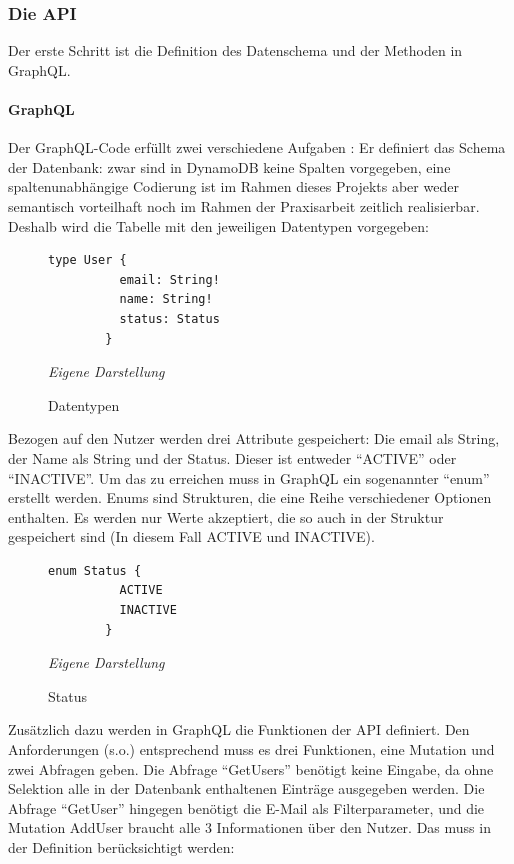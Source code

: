 	\subsubsection{Die API}
	Der erste Schritt ist die Definition des Datenschema und der Methoden in GraphQL.
	\paragraph{GraphQL}
	Der GraphQL-Code erfüllt zwei verschiedene Aufgaben \cite{GraphQL2024}: Er definiert das Schema der Datenbank: zwar sind in DynamoDB keine Spalten vorgegeben, eine spaltenunabhängige Codierung ist im Rahmen dieses Projekts aber weder semantisch vorteilhaft noch im Rahmen der Praxisarbeit zeitlich realisierbar. Deshalb wird die Tabelle mit den jeweiligen Datentypen vorgegeben:
	
		\begin{figure}[H]
		\centering
		\begin{minipage}[t]{.7\textwidth} %
		\caption{Datentypen} %
		\begin{lstlisting}[style=graphql]
		type User {
		  email: String!
		  name: String!
		  status: Status
		}
		\end{lstlisting}
		\textit{Eigene Darstellung} %
		\label{fig:datenTypen}
		\end{minipage}
		\end{figure}
	Bezogen auf den Nutzer werden drei Attribute gespeichert: Die email als String, der Name als String und der Status. Dieser ist entweder ``ACTIVE'' oder ``INACTIVE''. Um das zu erreichen muss in GraphQL ein sogenannter ``enum'' erstellt werden. Enums sind Strukturen, die eine Reihe verschiedener Optionen enthalten. Es werden nur Werte akzeptiert, die so auch in der Struktur gespeichert sind (In diesem Fall ACTIVE und INACTIVE). \cite{https://graphql.com/learn/enums/}
	
		\begin{figure}[H]
		\centering
		\begin{minipage}[t]{.7\textwidth} %
		\caption{Status} %
		\begin{lstlisting}[style=graphql]
		enum Status {
		  ACTIVE
		  INACTIVE
		}
		\end{lstlisting}
		\textit{Eigene Darstellung} %
		\label{fig:status}
		\end{minipage}
		\end{figure}
	
	Zusätzlich dazu werden in GraphQL die Funktionen der API definiert. Den Anforderungen (s.o.) entsprechend muss es drei Funktionen, eine Mutation und zwei Abfragen geben. Die Abfrage ``GetUsers'' benötigt keine Eingabe, da ohne Selektion alle in der Datenbank enthaltenen Einträge ausgegeben werden. Die Abfrage ``GetUser'' hingegen benötigt die E-Mail als Filterparameter, und die Mutation AddUser braucht alle 3 Informationen über den Nutzer. Das muss in der Definition berücksichtigt werden:
	

